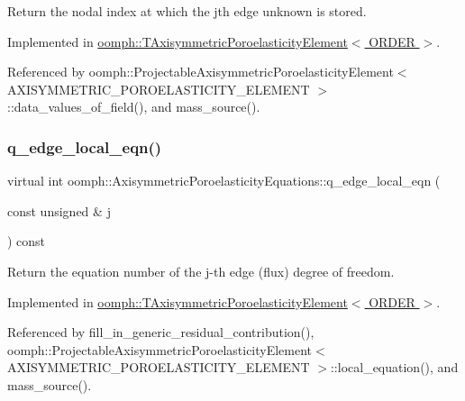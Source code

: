 Return the nodal index at which the jth edge unknown is stored. 



Implemented in \hyperlink{classoomph_1_1TAxisymmetricPoroelasticityElement_a2b121fc589935b789d63731c5195adb5}{oomph\+::\+T\+Axisymmetric\+Poroelasticity\+Element$<$ O\+R\+D\+E\+R $>$}.



Referenced by oomph\+::\+Projectable\+Axisymmetric\+Poroelasticity\+Element$<$ A\+X\+I\+S\+Y\+M\+M\+E\+T\+R\+I\+C\+\_\+\+P\+O\+R\+O\+E\+L\+A\+S\+T\+I\+C\+I\+T\+Y\+\_\+\+E\+L\+E\+M\+E\+N\+T $>$\+::data\+\_\+values\+\_\+of\+\_\+field(), and mass\+\_\+source().

\mbox{\label{classoomph_1_1AxisymmetricPoroelasticityEquations_a2cc9733c35e65c880246b3b072abb263}} 
\subsubsection{\texorpdfstring{q\+\_\+edge\+\_\+local\+\_\+eqn()}{q\_edge\_local\_eqn()}}
{\footnotesize\ttfamily virtual int oomph\+::\+Axisymmetric\+Poroelasticity\+Equations\+::q\+\_\+edge\+\_\+local\+\_\+eqn (\begin{DoxyParamCaption}\item[{const unsigned \&}]{j }\end{DoxyParamCaption}) const\hspace{0.3cm}{\ttfamily [pure virtual]}}



Return the equation number of the j-\/th edge (flux) degree of freedom. 



Implemented in \hyperlink{classoomph_1_1TAxisymmetricPoroelasticityElement_ac6fcfbad57e73d5f6bacff687a67df4b}{oomph\+::\+T\+Axisymmetric\+Poroelasticity\+Element$<$ O\+R\+D\+E\+R $>$}.



Referenced by fill\+\_\+in\+\_\+generic\+\_\+residual\+\_\+contribution(), oomph\+::\+Projectable\+Axisymmetric\+Poroelasticity\+Element$<$ A\+X\+I\+S\+Y\+M\+M\+E\+T\+R\+I\+C\+\_\+\+P\+O\+R\+O\+E\+L\+A\+S\+T\+I\+C\+I\+T\+Y\+\_\+\+E\+L\+E\+M\+E\+N\+T $>$\+::local\+\_\+equation(), and mass\+\_\+source().

